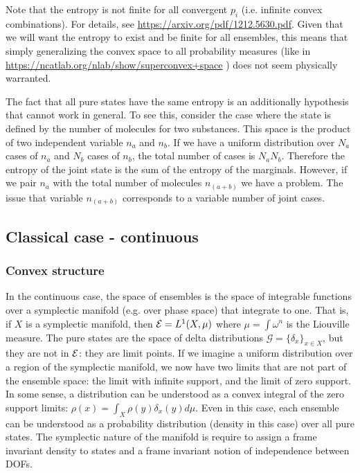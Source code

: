 Note that the entropy is not finite for all convergent $p_i$ (i.e. infinite convex combinations). For details, see \url{https://arxiv.org/pdf/1212.5630.pdf}. Given that we will want the entropy to exist and be finite for all ensembles, this means that simply generalizing the convex space to all probability measures (like in \url{https://ncatlab.org/nlab/show/superconvex+space} ) does not seem physically warranted.

The fact that all pure states have the same entropy is an additionally hypothesis that cannot work in general. To see this, consider the case where the state is defined by the number of molecules for two substances. This space is the product of two independent variable $n_a$ and $n_b$. If we have a uniform distribution over $N_a$ cases of $n_a$ and $N_b$ cases of $n_b$, the total number of cases is $N_a N_b$. Therefore the entropy of the joint state is the sum of the entropy of the marginals. However, if we pair $n_a$ with the total number of molecules $n_{(a+b)}$ we have a problem. The issue that variable $n_{(a+b)}$ corresponds to a variable number of joint cases.

\subsection{Classical case - continuous}

\subsubsection{Convex structure}

In the continuous case, the space of ensembles is the space of integrable functions over a symplectic manifold (e.g.  over phase space) that integrate to one. That is, if $X$ is a symplectic manifold, then $\mathcal{E} = L^1(X, \mu)$ where $\mu=\int \omega^n$ is the Liouville measure. The pure states are the space of delta distributions $\mathcal{G} = \{\delta_x\}_{x \in X}$, but they are not in  $\mathcal{E}$: they are limit points. If we imagine a uniform distribution over a region of the symplectic manifold, we now have two limits that are not part of the ensemble space: the limit with infinite support, and the limit of zero support. In some sense, a distribution can be understood as a convex integral of the zero support limits: $\rho(x) = \int_X \rho(y) \delta_x(y) d\mu$. Even in this case, each ensemble can be understood as a probability distribution (density in this case) over all pure states. The symplectic nature of the manifold is require to assign a frame invariant density to states and a frame invariant notion of independence between DOFs.

